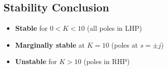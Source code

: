 \documentclass{article}
\begin{document}
	\subsection*{Stability Conclusion}
	\begin{itemize}
		\item \textbf{Stable} for \(0 < K < 10\) (all poles in LHP)
		\item \textbf{Marginally stable} at \(K = 10\) (poles at \(s = \pm j\))
		\item \textbf{Unstable} for \(K > 10\) (poles in RHP)
	\end{itemize}
	
\end{document}
